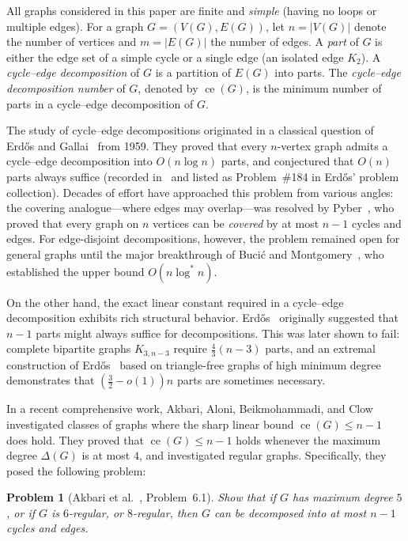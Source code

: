 \documentclass[11pt,reqno]{amsart}
\newtheorem{problem}[theorem]{Problem}
\theoremstyle{definition}
\theoremstyle{remark}
\DeclareMathOperator{\ce}{ce}
\begin{document}
All graphs considered in this paper are finite and \emph{simple} (having no loops or multiple edges). For a graph $G = (V(G), E(G))$, let $n = |V(G)|$ denote the number of vertices and $m = |E(G)|$ the number of edges. A \emph{part} of $G$ is either the edge set of a simple cycle or a single edge (an isolated edge $K_2$). A \emph{cycle--edge decomposition} of $G$ is a partition of $E(G)$ into parts. The \emph{cycle--edge decomposition number} of $G$, denoted by $\ce(G)$, is the minimum number of parts in a cycle--edge decomposition of $G$.

The study of cycle--edge decompositions originated in a classical question of Erd\H{o}s and Gallai~\cite{EG59} from 1959. They proved that every $n$-vertex graph admits a cycle--edge decomposition into $O(n \log n)$ parts, and conjectured that $O(n)$ parts always suffice (recorded in~\cite{EGP66} and listed as Problem~\#184 in Erd\H{o}s' problem collection). Decades of effort have approached this problem from various angles: the covering analogue---where edges may overlap---was resolved by Pyber~\cite{Py85}, who proved that every graph on $n$ vertices can be \emph{covered} by at most $n-1$ cycles and edges. For edge-disjoint decompositions, however, the problem remained open for general graphs until the major breakthrough of Buci\'c and Montgomery~\cite{BM23}, who established the upper bound $O(n \log^* n)$.

On the other hand, the exact linear constant required in a cycle--edge decomposition exhibits rich structural behavior. Erd\H{o}s~\cite{Er71} originally suggested that $n-1$ parts might always suffice for decompositions. This was later shown to fail: complete bipartite graphs $K_{3, n-3}$ require $\frac{4}{3}(n-3)$ parts, and an extremal construction of Erd\H{o}s~\cite{E83} based on triangle-free graphs of high minimum degree demonstrates that $(\frac{3}{2} - o(1))n$ parts are sometimes necessary. 

In a recent comprehensive work, Akbari, Aloni, Beikmohammadi, and Clow~\cite{AABC25} investigated classes of graphs where the sharp linear bound $\ce(G) \le n-1$ does hold. They proved that $\ce(G) \le n-1$ holds whenever the maximum degree $\Delta(G)$ is at most $4$, and investigated regular graphs. Specifically, they posed the following problem:

\begin{problem}[Akbari et al.~\cite{AABC25}, Problem~6.1]\label{prob:aabc-6.1}
Show that if $G$ has maximum degree $5$, or if $G$ is $6$-regular, or $8$-regular, then $G$ can be decomposed into at most $n-1$ cycles and edges.
\end{problem}
\end{document}
